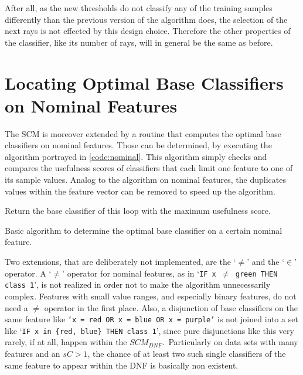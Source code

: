 After all, as the new thresholds do not classify any of the training samples
differently than the previous version of the algorithm does,
the selection of the next rays is not effected by this design choice.
Therefore the other properties of the classifier, like its number of rays, will in general
be the same as before.

\section{Locating Optimal Base Classifiers on Nominal Features}\label{sec:nominal}

The SCM is moreover extended by a routine that computes the optimal base classifiers on nominal features.
Those can be determined, by executing the algorithm portrayed in \autoref{code:nominal}.
This algorithm simply checks and compares the usefulness scores of classifiers that each limit one feature to one of its sample values.
Analog to the algorithm on nominal features, the duplicates values within the feature vector can be removed to speed up the algorithm.

\begin{algorithm}[ht]
    Return the base classifier of this loop with the maximum usefulness score.
    \caption{Basic algorithm to determine the optimal base classifier on a certain nominal feature.}\label{code:nominal}
\end{algorithm}

Two extensions, that are deliberately not implemented, are the `\(\neq\)' and the `\(\in\)' operator.
A `\(\neq\)' operator for nominal features, as in `\texttt{IF x \(\neq\) green THEN class 1}', is not realized in order not to make the algorithm unnecessarily complex.
Features with small value ranges, and especially binary features, do not need a \(\neq\) operator in the first place.
Also, a disjunction of base classifiers on the same feature like \texttt{`x = red OR x = blue OR x = purple'}
is not joined into a set like `\verb|IF x in {red, blue} THEN class 1|', since pure disjunctions like this very rarely, if at all, happen within the \(SCM_{DNF}\).\
Particularly on data sets with many features and an \(sC > 1\), the chance of at least two such
single classifiers of the same feature to appear within the DNF is basically non existent.

